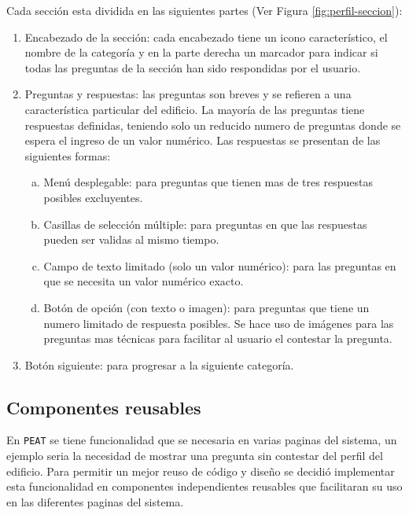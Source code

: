 Cada sección esta dividida en las siguientes partes (Ver Figura
\ref{fig:perfil-seccion}):
\begin{enumerate}
\item Encabezado de la sección: cada encabezado tiene un icono característico,
  el nombre de la categoría y en la parte derecha un marcador para indicar
  si todas las preguntas de la sección han sido respondidas por el usuario.
\item Preguntas y respuestas: las preguntas son breves y se refieren a una
  característica particular del edificio. La mayoría de las preguntas
  tiene respuestas definidas, teniendo solo un reducido numero de preguntas
  donde se espera el ingreso de un valor numérico. Las respuestas se
  presentan de las siguientes formas:
  \begin{enumerate}[a)]
  \item Menú desplegable: para preguntas que tienen mas de tres respuestas
    posibles excluyentes.
  \item Casillas de selección múltiple: para preguntas en que las respuestas
    pueden ser validas al mismo tiempo.
  \item Campo de texto limitado (solo un valor numérico): para las preguntas
    en que se necesita un valor numérico exacto.
  \item Botón de opción (con texto o imagen): para preguntas que tiene un
    numero limitado de respuesta posibles. Se hace uso de imágenes para las
    preguntas mas técnicas para facilitar al usuario el contestar la pregunta.
  \end{enumerate}
\item Botón siguiente: para progresar a la siguiente categoría.
\end{enumerate}


\subsection{Componentes reusables}
\label{subsec:componentes}

En \texttt{PEAT} se tiene funcionalidad que se necesaria en varias paginas del
sistema, un ejemplo seria la necesidad de mostrar una pregunta sin contestar del
perfil del edificio.
Para permitir un mejor reuso de código y diseño se decidió implementar esta
funcionalidad en componentes independientes reusables que facilitaran su uso
en las diferentes paginas del sistema.

